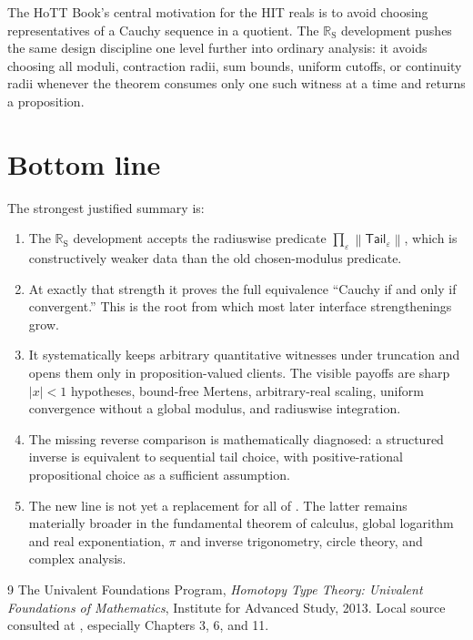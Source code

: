 \documentclass[11pt,a4paper]{article}
\newcommand{\RS}{\mathbb{R}_{\mathrm S}}
\newcommand{\brck}[1]{\left\lVert #1\right\rVert}
\newcommand{\Tail}{\mathsf{Tail}}
\newcommand{\code}[1]{{\ttfamily\seqsplit{#1}}}
\begin{document}
The HoTT Book's central motivation for the HIT reals is to avoid choosing representatives of
a Cauchy sequence in a quotient.  The $\RS$ development pushes the same design discipline one
level further into ordinary analysis: it avoids choosing all moduli, contraction radii, sum
bounds, uniform cutoffs, or continuity radii whenever the theorem consumes only one such
witness at a time and returns a proposition.

\section{Bottom line}

The strongest justified summary is:
\begin{enumerate}
\item The $\RS$ development accepts the radiuswise predicate
  $\prod_\varepsilon\brck{\Tail_\varepsilon}$, which is constructively weaker data than the
  old chosen-modulus predicate.
\item At exactly that strength it proves the full equivalence ``Cauchy if and only if
  convergent.''  This is the root from which most later interface strengthenings grow.
\item It systematically keeps arbitrary quantitative witnesses under truncation and opens
  them only in proposition-valued clients.  The visible payoffs are sharp $|x|<1$ hypotheses,
  bound-free Mertens, arbitrary-real scaling, uniform convergence without a global modulus,
  and radiuswise integration.
\item The missing reverse comparison is mathematically diagnosed: a structured inverse is
  equivalent to sequential tail choice, with positive-rational propositional choice as a
  sufficient assumption.
\item The new line is not yet a replacement for all of \code{HITs/CauchyReals}.  The latter
  remains materially broader in the fundamental theorem of calculus, global logarithm and
  real exponentiation, $\pi$ and inverse trigonometry, circle theory, and complex analysis.
\end{enumerate}

\begin{thebibliography}{9}
The Univalent Foundations Program,
\emph{Homotopy Type Theory: Univalent Foundations of Mathematics},
Institute for Advanced Study, 2013.
Local source consulted at , especially Chapters 3, 6, and 11.
\end{thebibliography}
\end{document}

